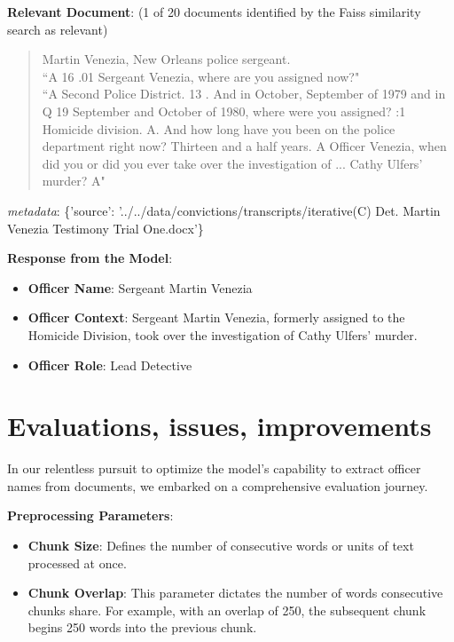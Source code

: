 \documentclass{article}
\begin{document}
\noindent \textbf{Relevant Document}:  
(1 of 20 documents identified by the Faiss similarity search as relevant)

\begin{quote}
Martin Venezia, New Orleans police sergeant.\\
``A 16 .01 Sergeant Venezia, where are you assigned now?"\\
``A Second Police District. 13 . And in October, September of 1979 and in Q 19 September and October of 1980, where were you assigned? :1 Homicide division. A. And how long have you been on the police department right now? Thirteen and a half years. A Officer Venezia, when did you or did you ever take over the investigation of ... Cathy Ulfers' murder? A"
\end{quote}
\textit{metadata}: \{'source': '../../data/convictions/transcripts/iterative(C) Det. Martin Venezia Testimony Trial One.docx'\}

\noindent \textbf{Response from the Model}:

\begin{itemize}
    \item \textbf{Officer Name}: Sergeant Martin Venezia  
    \item \textbf{Officer Context}: Sergeant Martin Venezia, formerly assigned to the Homicide Division, took over the investigation of Cathy Ulfers' murder.  
    \item \textbf{Officer Role}: Lead Detective
\end{itemize}

\section{Evaluations, issues, improvements}

In our relentless pursuit to optimize the model's capability to extract officer names from documents, we embarked on a comprehensive evaluation journey.

\noindent \textbf{Preprocessing Parameters}:
\begin{itemize}
    \item \textbf{Chunk Size}: Defines the number of consecutive words or units of text processed at once.
    \item \textbf{Chunk Overlap}: This parameter dictates the number of words consecutive chunks share. For example, with an overlap of 250, the subsequent chunk begins 250 words into the previous chunk.
\end{itemize}
\end{document}
